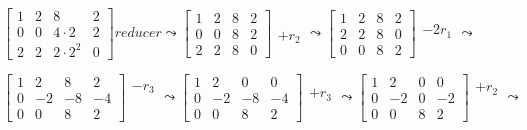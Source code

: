 \documentclass[a4paper,12pt]{article}
\begin{document}
$
\left[\begin{array}{ccc|c}
    1 & 2 & 8 & 2 \\
    0 & 0 & 4\cdot2 & 2 \\
    2 & 2 & 2\cdot2^2 & 0
\end{array}\right]
reducer
\leadsto
\left[\begin{array}{ccc|c}
    1 & 2 & 8 & 2 \\
    0 & 0 & 8 & 2 \\
    2 & 2 & 8 & 0
\end{array}\right]
\begin{array}{ccc}
    \\
    \\
    +r_2\\
\end{array}
\leadsto
\left[\begin{array}{ccc|c}
    1 & 2 & 8 & 2 \\
    2 & 2 & 8 & 0 \\
    0 & 0 & 8 & 2
\end{array}\right]
\begin{array}{ccc}
    \\
    -2r_1\\
    \\
\end{array}
\leadsto
$

$
\left[\begin{array}{ccc|c}
    1 & 2 & 8 & 2 \\
    0 & -2 & -8 & -4 \\
    0 & 0 & 8 & 2
\end{array}\right]
\begin{array}{ccc}
    -r_3\\
    \\
    \\
\end{array}
\leadsto
\left[\begin{array}{ccc|c}
    1 & 2 & 0 & 0 \\
    0 & -2 & -8 & -4 \\
    0 & 0 & 8 & 2
\end{array}\right]
\begin{array}{ccc}
    \\
    +r_3\\
    \\
\end{array}
\leadsto
\left[\begin{array}{ccc|c}
    1 & 2 & 0 & 0 \\
    0 & -2 & 0 & -2 \\
    0 & 0 & 8 & 2
\end{array}\right]
\begin{array}{ccc}
    +r_2\\
    \\
    \\
\end{array}
\leadsto
$
\end{document}
